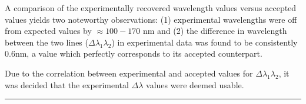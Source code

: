 \documentclass[paper=a4, fontsize=11pt]{scrartcl} %
\numberwithin{equation}{section}
\numberwithin{figure}{section}
\numberwithin{table}{section}
\begin{document}
A comparison of the experimentally recovered wavelength values versus accepted values yields two noteworthy observations: (1) experimental wavelengths were off from expected values by $\approx 100 - 170$ nm and (2) the difference in wavelength between the two lines ($\Delta\lambda_1\lambda_2$) in experimental data was found to be consistently $0.6$nm, a value which perfectly corresponds to its accepted counterpart.

Due to the correlation between experimental and accepted values for $\Delta \lambda_1 \lambda_2$, it was decided that the experimental $\Delta \lambda$ values were deemed usable.

\vspace{1.2em}

\hrule
\vspace{0.7em}
\end{document}
